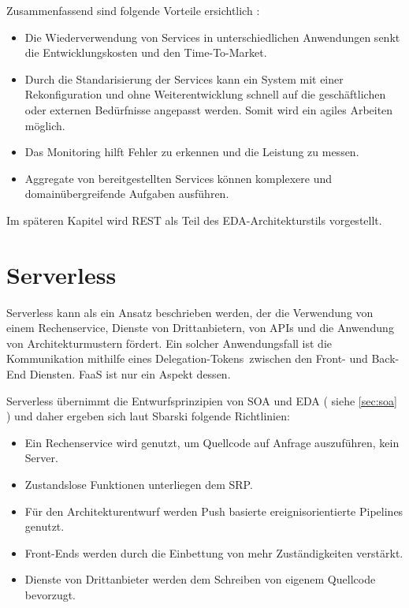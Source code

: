 \documentclass[
12pt,
english,
ngerman,
headsepline,
twoside,
openright,
numbers=noenddot,version=first
]{scrreprt}
\begin{document}
Zusammenfassend sind folgende Vorteile ersichtlich \cite{cloudEssentials}:
\begin{itemize}
	\item Die Wiederverwendung von Services in unterschiedlichen Anwendungen senkt die Entwicklungskosten und den Time-To-Market.
	\item Durch die Standarisierung der Services kann ein System mit einer Rekonfiguration und ohne Weiterentwicklung schnell auf die geschäftlichen oder externen Bedürfnisse angepasst werden. Somit wird ein agiles Arbeiten möglich.
	\item Das Monitoring hilft Fehler zu erkennen und die Leistung zu messen.
	\item Aggregate von bereitgestellten Services können komplexere und domainübergreifende Aufgaben ausführen.
\end{itemize}

Im späteren Kapitel wird REST als Teil des \acrshort{EDA}-Architekturstils vorgestellt.\\

\section{Serverless}
\label{sec:serverless}

Serverless kann als ein Ansatz beschrieben werden, der die Verwendung von einem Rechenservice, Dienste von Drittanbietern, von \acrfull{API}s und die Anwendung von Architekturmustern fördert. Ein solcher Anwendungsfall ist die Kommunikation mithilfe eines \glqq Delegation-Tokens\grqq\ zwischen den Front- und Back-End Diensten. \acrshort{FaaS} ist nur ein Aspekt dessen.


Serverless übernimmt die Entwurfsprinzipien von \acrshort{SOA} und \acrshort{EDA} ( siehe \autoref{sec:soa} ) und daher ergeben sich laut Sbarski folgende Richtlinien:
\begin{itemize}\label{par:serverless-principles}
	\item Ein Rechenservice wird genutzt, um Quellcode auf Anfrage auszuführen, kein Server.
	\item Zustandslose Funktionen unterliegen dem \acrfull{SRP}.
	\item Für den Architekturentwurf werden Push basierte ereignisorientierte Pipelines genutzt.
	\item Front-Ends werden durch die Einbettung von mehr Zuständigkeiten verstärkt.
	\item Dienste von Drittanbieter werden dem Schreiben von eigenem Quellcode bevorzugt.
\end{itemize}\cite{serverlessArchAWS}
\end{document}
